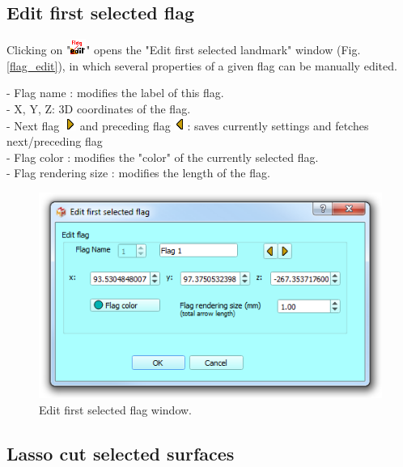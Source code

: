 \subsection{Edit first selected flag}
Clicking on "\includegraphics[scale=0.7]{images/06/objects/flag_edit.png}" opens the "Edit first selected landmark" window (Fig. \ref{flag_edit}), in which several properties of a given flag can be manually edited.

- Flag name : modifies the label of this flag.\\
- X, Y, Z: 3D coordinates of the flag.\\
- Next flag \includegraphics[scale=0.7]{images/06/objects/s_right.png} and preceding flag \includegraphics[scale=0.7]{images/06/objects/s_left.png}: saves currently  settings and fetches next/preceding flag\\
- Flag color : modifies the "color" of the currently selected flag.\\
- Flag rendering size : modifies the length of the flag.


\begin{figure}
  \centering
  \includegraphics[scale=0.55]{images/06/objects/edit_flag.png} 
	\caption{Edit first selected flag window.}
\label{landmark_edit}
 
\end{figure}
\subsection{Lasso cut selected surfaces} \label{lasso_cut_section}

